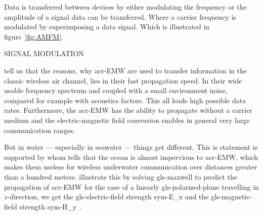  Data is transferred between devices by either modulating the frequency or the amplitude of a signal data can be transferred. Where a carrier frequency is modulated by superimposing a data signal. Which is illustrated in figure~\ref{fig:AMFM}.

\begin{RoyalFigure}[htb, label=fig:AMFM]{SIGNAL MODULATION}
  \begin{tcbraster}[raster columns=2, raster equal height]
  \end{tcbraster}
\end{RoyalFigure}

\citet{hagman_elias_design_2009} tell us that the reasons, why \gls{acr-EMW} are used to transfer information in the classic wireless air channel, lies in their fast propagation speed. In their wide usable frequency spectrum and coupled with a small environment noise, compared for example with acoustics factors. This all leads high possible data rates. Furthermore, the \gls{acr-EMW} has the ability to propagate without a carrier medium and the electric-magnetic field conversion enables in general very large communication ranges.

But in water --- especially in seawater --- things get different. This is statement is supported by \citet{ramakrishna_next_2012} whom tells that the ocean is almost impervious to \gls{acr-EMW}, which makes them useless for wireless underwater communication over distances greater than a hundred meters.
\citet{hagman_elias_design_2009} illustrate this by solving \gls{gls-maxwell} to predict the propagation of \gls{acr-EMW} for the case of a linearly \gls{gls-polarized-plane} travelling in \(z\)-direction,
we get the \gls{gls-electric-field} strength \gls{sym-E_x}  and the \gls{gls-magnetic-field} strength \gls{sym-H_y}~\cite{hagman_elias_design_2009}.

